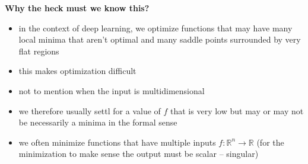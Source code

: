\documentclass[11pt, twocolumn]{report}
\def\realnumbers{\mathbb{R}}
\begin{document}
\textbf{Why the heck must we know this?}
\begin{itemize}
  \item in the context of deep learning, we optimize functions that may have
    many local minima that aren't optimal and many saddle points surrounded by
    very flat regions
  \item this makes optimization difficult
  \item not to mention when the input is multidimensional
  \item we therefore usually settl for a value of $f$ that is very low but may
    or may not be necessarily a minima in the formal sense
  \item we often minimize functions that have multiple inputs $f :
    \realnumbers^n \to \realnumbers$ (for the minimization to make sense the
    output must be scalar -- singular)
\end{itemize}
\end{document}
